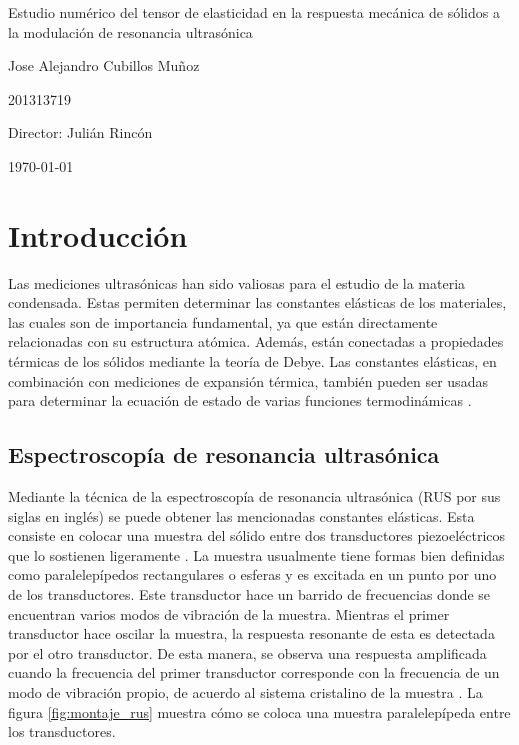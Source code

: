 \documentclass[12pt]{article}
\begin{document}
\begin{center}
\Huge
Estudio numérico del tensor de elasticidad en la respuesta mecánica de sólidos a la modulación de resonancia ultrasónica

\vspace{3mm}
\Large Jose Alejandro Cubillos Muñoz

\large
201313719


\vspace{2mm}
\Large
Director: Julián Rincón

\normalsize
\vspace{2mm}

\today
\end{center}


\normalsize
\section{Introducción}

Las mediciones ultrasónicas han sido valiosas para el estudio de la materia condensada. Estas permiten determinar las constantes elásticas de los materiales, las cuales son de importancia fundamental, ya que están directamente relacionadas con su estructura atómica. Además, están conectadas a propiedades térmicas de los sólidos mediante la teoría de Debye. Las constantes elásticas, en combinación con mediciones de expansión térmica, también pueden ser usadas para determinar la ecuación de estado de varias funciones termodinámicas \cite{Leisure_1997}.

\subsection {Espectroscopía de resonancia ultrasónica}

Mediante la técnica de la espectroscopía de resonancia ultrasónica (RUS por sus siglas en inglés) se puede obtener las mencionadas constantes elásticas. Esta consiste en colocar una muestra del sólido entre dos transductores piezoeléctricos que lo sostienen ligeramente \cite{MIGLIORI19931}. La muestra usualmente tiene formas bien definidas como paralelepípedos rectangulares o esferas y es excitada en un punto por uno de los transductores. Este transductor hace un barrido de frecuencias donde se encuentran varios modos de vibración de la muestra. Mientras el primer transductor hace oscilar la muestra, la respuesta resonante de esta es detectada por el otro transductor. De esta manera, se observa una respuesta amplificada cuando la frecuencia del primer transductor corresponde con la frecuencia de un modo de vibración propio, de acuerdo al sistema cristalino de la muestra \cite{Leisure_1997}. La figura \ref{fig:montaje_rus} muestra cómo se coloca una muestra paralelepípeda entre los transductores.
\end{document}
